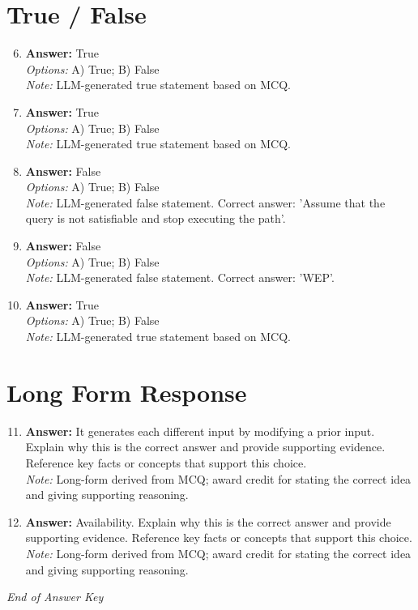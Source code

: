 \documentclass[12pt]{article}
\begin{document}
\section*{True / False}
\begin{enumerate}[label=\arabic*.]
\setcounter{enumi}{5}
\item \textbf{Answer:} True
\\ \textit{Options:} A) True; B) False
\\ \textit{Note:} LLM-generated true statement based on MCQ.
\item \textbf{Answer:} True
\\ \textit{Options:} A) True; B) False
\\ \textit{Note:} LLM-generated true statement based on MCQ.
\item \textbf{Answer:} False
\\ \textit{Options:} A) True; B) False
\\ \textit{Note:} LLM-generated false statement. Correct answer: 'Assume that the query is not satisfiable and stop executing the path'.
\item \textbf{Answer:} False
\\ \textit{Options:} A) True; B) False
\\ \textit{Note:} LLM-generated false statement. Correct answer: 'WEP'.
\item \textbf{Answer:} True
\\ \textit{Options:} A) True; B) False
\\ \textit{Note:} LLM-generated true statement based on MCQ.
\end{enumerate}

\section*{Long Form Response}
\begin{enumerate}[label=\arabic*.]
\setcounter{enumi}{10}
\item \textbf{Answer:} It generates each different input by modifying a prior input. Explain why this is the correct answer and provide supporting evidence. Reference key facts or concepts that support this choice.
\\ \textit{Note:} Long-form derived from MCQ; award credit for stating the correct idea and giving supporting reasoning.
\item \textbf{Answer:} Availability. Explain why this is the correct answer and provide supporting evidence. Reference key facts or concepts that support this choice.
\\ \textit{Note:} Long-form derived from MCQ; award credit for stating the correct idea and giving supporting reasoning.
\end{enumerate}

\vfill
\noindent\textit{End of Answer Key}
\end{document}
